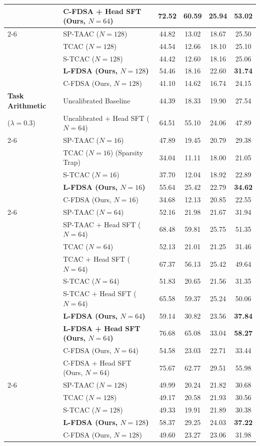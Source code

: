 \documentclass{article}
\begin{document}
\begin{table}[t]
\begin{center}
\begin{small}
\begin{sc}
\begin{tabular}{llcccc}
& C-FDSA + Head SFT (Ours, $N=64$) & 72.52 & 60.59 & 25.94 & 53.02 \\
\cmidrule{2-6}
& SP-TAAC ($N=128$) & 44.82 & 13.02 & 18.67 & 25.50 \\
& TCAC ($N=128$) & 44.54 & 12.66 & 18.10 & 25.10 \\
& S-TCAC ($N=128$) & 44.42 & 12.60 & 18.16 & 25.06 \\
& \textbf{L-FDSA (Ours, $N=128$)} & 54.46 & 18.16 & 22.60 & \textbf{31.74} \\
& C-FDSA (Ours, $N=128$) & 41.10 & 14.62 & 16.74 & 24.15 \\
\midrule
\textbf{Task Arithmetic} & Uncalibrated Baseline & 44.39 & 18.33 & 19.90 & 27.54 \\
($\lambda = 0.3$) & Uncalibrated + Head SFT ($N=64$) & 64.51 & 55.10 & 24.06 & 47.89 \\
\cmidrule{2-6}
& SP-TAAC ($N=16$) & 47.89 & 19.45 & 20.79 & 29.38 \\
& TCAC ($N=16$) (Sparsity Trap) & 34.04 & 11.11 & 18.00 & 21.05 \\
& S-TCAC ($N=16$) & 37.70 & 12.04 & 18.92 & 22.89 \\
& \textbf{L-FDSA (Ours, $N=16$)} & 55.64 & 25.42 & 22.79 & \textbf{34.62} \\
& C-FDSA (Ours, $N=16$) & 34.68 & 12.13 & 20.85 & 22.55 \\
\cmidrule{2-6}
& SP-TAAC ($N=64$) & 52.16 & 21.98 & 21.67 & 31.94 \\
& SP-TAAC + Head SFT ($N=64$) & 68.48 & 59.81 & 25.75 & 51.35 \\
& TCAC ($N=64$) & 52.13 & 21.01 & 21.25 & 31.46 \\
& TCAC + Head SFT ($N=64$) & 67.37 & 56.13 & 25.42 & 49.64 \\
& S-TCAC ($N=64$) & 51.83 & 20.65 & 21.56 & 31.35 \\
& S-TCAC + Head SFT ($N=64$) & 65.58 & 59.37 & 25.24 & 50.06 \\
& \textbf{L-FDSA (Ours, $N=64$)} & 59.14 & 30.82 & 23.56 & \textbf{37.84} \\
& \textbf{L-FDSA + Head SFT (Ours, $N=64$)} & 76.68 & 65.08 & 33.04 & \textbf{58.27} \\
& C-FDSA (Ours, $N=64$) & 54.58 & 23.03 & 22.71 & 33.44 \\
& C-FDSA + Head SFT (Ours, $N=64$) & 75.67 & 62.77 & 29.51 & 55.98 \\
\cmidrule{2-6}
& SP-TAAC ($N=128$) & 49.99 & 20.24 & 21.82 & 30.68 \\
& TCAC ($N=128$) & 49.17 & 20.58 & 21.93 & 30.56 \\
& S-TCAC ($N=128$) & 49.33 & 19.91 & 21.89 & 30.38 \\
& \textbf{L-FDSA (Ours, $N=128$)} & 58.37 & 29.25 & 24.03 & \textbf{37.22} \\
& C-FDSA (Ours, $N=128$) & 49.60 & 23.27 & 23.06 & 31.98 \\
\bottomrule
\end{tabular}
\end{sc}
\end{small}
\end{center}
\vskip -0.1in
\end{table}
\end{document}
